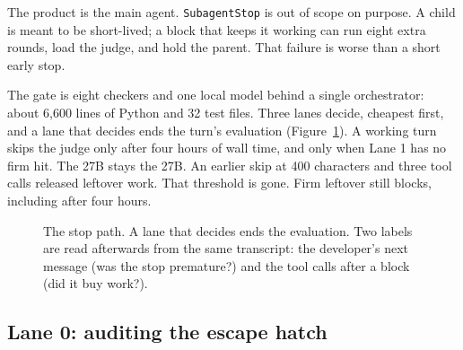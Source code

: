 The product is the main agent. \texttt{SubagentStop} is out of scope on
purpose. A child is meant to be short-lived; a block that keeps it working
can run eight extra rounds, load the judge, and hold the parent. That
failure is worse than a short early stop.

The gate is eight checkers and one local model behind a single orchestrator:
about 6,600 lines of Python and 32 test files. Three lanes decide, cheapest
first, and a lane that decides ends the turn's evaluation
(Figure~\ref{fig:lanes}). A working turn skips the judge only after four
hours of wall time, and only when Lane 1 has no firm hit. The 27B stays
the 27B. An earlier skip at 400 characters and three tool calls released
leftover work. That threshold is gone. Firm leftover still blocks, including
after four hours.

\begin{figure}[ht]
\centering
{}
\caption{The stop path. A lane that decides ends the evaluation. Two labels
are read afterwards from the same transcript: the developer's next message
(was the stop premature?) and the tool calls after a block (did it buy work?).}
\label{fig:lanes}
\end{figure}

\subsection{Lane 0: auditing the escape hatch}

